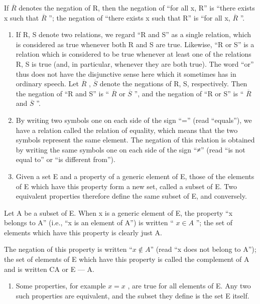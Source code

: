 If \(\overline{R}\) denotes the negation of R, then the negation of ``for all x, R'' is ``there exists x such that \(\overline{R}\) ''; the negation of ``there exists x such that R'' is ``for all x, \(\overline{R}\) ''.

\begin{enumerate}
\def\labelenumi{\arabic{enumi}.}
\setcounter{enumi}{4}
\item
  If R, S denote two relations, we regard ``R and S'' as a single relation, which is considered as true whenever both R and S are true. Likewise, ``R or S'' is a relation which is considered to be true whenever at least one of the relations R, S is true (and, in particular, whenever they are both true). The word ``or'' thus does not have the disjunctive sense here which it sometimes has in ordinary speech. Let \(\overline{R}\) , \(\overline{S}\) denote the negations of R, S, respectively. Then the negation of ``R and S'' is `` \(\overline{R}\) or \(\overline{S}\) '', and the negation of ``R or S'' is `` \(\overline{R}\) and \(\overline{S}\) ''.
\item
  By writing two symbols one on each side of the sign ``='' (read ``equals''), we have a relation called the relation of equality, which means that the two symbols represent the same element. The negation of this relation is obtained by writing the same symbols one on each side of the sign ``≠'' (read ``is not equal to'' or ``is different from'').
\item
  Given a set E and a property of a generic element of E, those of the elements of E which have this property form a new set, called a subset of E. Two equivalent properties therefore define the same subset of E, and conversely.
\end{enumerate}

Let A be a subset of E. When x is a generic element of E, the property ``x belongs to A'' (i.e., ``x is an element of A'') is written `` \(x \in A\) ''; the set of elements which have this property is clearly just A.

The negation of this property is written ``\(x \notin A\)'' (read ``x does not belong to A''); the set of elements of E which have this property is called the complement of A and is written CA or E --- A.

\begin{enumerate}
\def\labelenumi{\arabic{enumi}.}
\setcounter{enumi}{7}
\tightlist
\item
  Some properties, for example \(x = x\) , are true for all elements of E. Any two such properties are equivalent, and the subset they define is the set E itself.
\end{enumerate}

